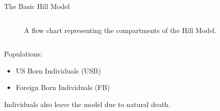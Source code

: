\documentclass[final]{beamer}
\begin{document}
\begin{frame}
\begin{columns}
\begin{column}{.3\textwidth}
\begin{block}{The Basic Hill Model}
\begin{block}{}
\begin{column}{.6\textwidth}
\begin{figure}[h]
              \caption{A flow chart representing the compartments of the Hill
                       Model.}
              \label{fig:hillFlow}
            \end{figure}
          \end{column}
          \begin{column}{.33\textwidth}
            Populations:
            \begin{itemize}
              \item US Born Individuals (USB) 
              \item Foreign Born Individuals (FB)
            \end{itemize}
            Individuals also leave the model due to natural death.
          \end{column}
        \end{block}
      \end{block}
    \end{column}
    

\end{columns}
\end{frame}
\end{document}
